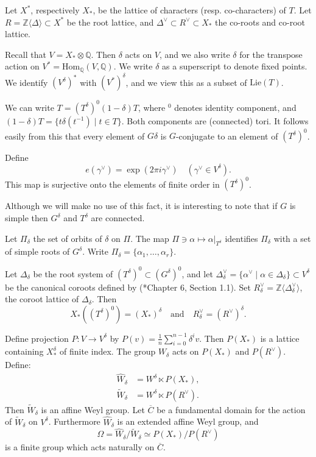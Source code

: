 \documentclass[10pt,leqno]{article}
\newcommand{\Hom}{\text{Hom}}
\newcommand{\Lie}{\text{Lie}}
\newcommand{\Z}{\mathbb Z}
\newcommand{\Q}{\mathbb Q}
\newcommand{\ch}[1]{#1^\vee}
\newcommand\inv{^{-1}}
\newcommand\wt{\widetilde}
\newcommand\wh{\widehat}
\begin{document}
Let $X^*$, respectively $X_*$, be the lattice of characters (resp. co-characters) of $T$.
Let $R=\Z\langle\Delta\rangle\subset X^*$ be
the root lattice, and $\ch\Delta\subset \ch R\subset X_*$ the co-roots and co-root lattice.

Recall that $V=X_*\otimes\Q$. Then $\delta$ acts on $V$, and we also write
$\delta$ for the transpose action on $V^*=\Hom_\Q(V,\Q)$.
We write $\delta$ as a superscript to denote fixed points.
We identify $(V^\delta)^*$ with $(V^*)^\delta$, and we view this as a subset of $\Lie(T)$.

We can write $T=(T^\delta)^0(1-\delta)T$, where $\phantom{}^0$ denotes identity component,
and $(1-\delta)T=\{t\delta(t\inv)\mid t\in T\}$. Both components are (connected) tori.
It follows easily from this that every element of $G\delta$ is $G$-conjugate
to an element of $(T^\delta)^0$.

Define
\begin{equation}
\label{e:e}
e(\ch\gamma)=\exp(2\pi i\ch\gamma) \quad(\ch\gamma\in V^\delta).
\end{equation}
This map is surjective  onto the elements of finite order in $(T^\delta)^0$.

Although we will make no use of this fact, it is interesting to note that if $G$ is simple then
$G^\delta$  and $T^\delta$ are connected.

Let $\Pi_\delta$ the set of orbits of $\delta$ on $\Pi$. The map
$\Pi\ni\alpha\mapsto \alpha|_{T^{\delta}}$ identifies $\Pi_\delta$ with 
a set of simple roots of 
$G^{\delta}$. Write $\Pi_\delta=\{\alpha_1,\dots,\alpha_r\}$.

Let $\Delta_\delta$ be the root system of
$(T^{\delta})^0\subset (G^{\delta})^0$, and let
$\ch\Delta_\delta=\{\ch\alpha\mid \alpha\in\Delta_\delta\}\subset
V^\delta$ be the canonical coroots defined by
(\cite{bourbaki_4-6}*{Chapter 6, Section 1.1}).
Set $\ch R_\delta=\Z\langle\ch\Delta_\delta\rangle$, the coroot lattice of $\Delta_\delta$.
Then
$$
X_*((T^{\delta})^0)=(X_*)^\delta\quad\text{and}\quad \ch R_\delta=(\ch R)^\delta.
$$

Define projection $P:V\rightarrow V^\delta$ by
$P(v)=\frac1n \sum_{i=0}^{n-1}\delta^iv$.
Then $P(X_*)$ is a lattice containing $X_*^\delta$ of finite index.
The group $W_\delta$ acts on $P(X_*)$ and $P(\ch R)$. Define:
\begin{equation}
\label{e:affine}
\begin{aligned}
\wh W_\delta&=W^\delta\ltimes P(X_*), \\
\wt W_\delta&=W^\delta\ltimes P(\ch R).
\end{aligned}
\end{equation}
Then $\wt W_\delta$ is an affine Weyl group. Let $\overline C$ be a
fundamental domain for the action of $\wt W_\delta$ on $V^\delta$.
Furthermore
$\wh W_\delta$ is an extended affine Weyl group, and
$$
\Omega=\wh W_\delta/\wt W_\delta\simeq P(X_*)/P(\ch R)
$$
is a finite group which acts naturally on $\overline C$.
\end{document}
